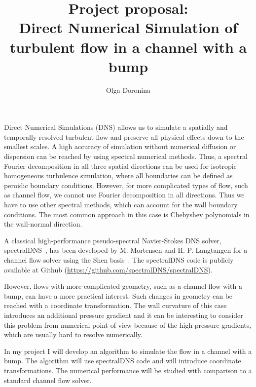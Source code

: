 \documentclass[letterpaper,12pt,fleqn, twocolumn]{article}
\title{Project proposal:\\
Direct Numerical Simulation of turbulent flow in a channel with a bump }
\author{Olga Doronina}
\begin{document}
\maketitle

Direct Numerical Simulations (DNS) allows us to simulate a spatially and temporally resolved turbulent flow and preserve all physical effects down to the smallest scales. A high accuracy of simulation without numerical diffusion or dispersion can be reached by using spectral numerical methods. Thus, a spectral Fourier decomposition in all three spatial directions can be used for isotropic homogeneous turbulence simulation, where  all boundaries can be defined as peroidic boundary conditions. However, for more complicated types of flow, such as channel flow, we cannot use Fourier decomposition in all directions. Thus we have to use other spectral methods, which can account for the wall boundary conditions. The most common approach in this case is Chebyshev polynomials in the wall-normal direction. 
 
A classical high-performance pseudo-spectral Navier-Stokes DNS solver, spectralDNS~\cite{mortensen_high_2016}, has been developed by M. Mortensen and H. P. Langtangen for a channel flow solver using the Shen basis~\cite{mortensen_spectral-galerkin_2017}. The spectralDNS code is publicly available at Github (\url{https://github.com/spectralDNS/spectralDNS}).  

However, flows with more complicated geometry, such as a channel flow with a bump, can have a more practical interest. Such changes in geometry can be reached with a coordinate transformation. The wall curvature of this case introduces an additional pressure gradient and it can be interesting to consider this problem from numerical point of view because of the high pressure gradients, which are usually hard to resolve numerically.  

In my project I will develop an algorithm to simulate the flow in a channel with a bump. The algorithm will use spectralDNS code  and will introduce coordinate transformations. The numerical performance will be studied with comparison to a standard channel flow solver.





 
\end{document}
